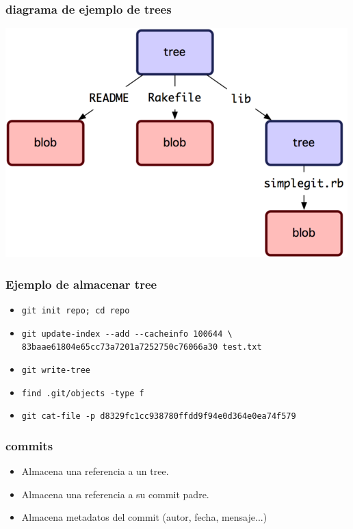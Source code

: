 \documentclass[10pt]{beamer}
\begin{document}
  \begin{frame}[containsverbatim]
    \frametitle{diagrama de ejemplo de trees}
    \begin{center}\includegraphics{trees.png}\end{center}
  \end{frame}

  \begin{frame}[containsverbatim]
    \frametitle{Ejemplo de almacenar tree}
    \begin{itemize}
        \item \verb$git init repo; cd repo$
        \item \verb$git update-index --add --cacheinfo 100644 \$ \verb$83baae61804e65cc73a7201a7252750c76066a30 test.txt$
        \item \verb$git write-tree$
        \item \verb$find .git/objects -type f$
        \item \verb$git cat-file -p d8329fc1cc938780ffdd9f94e0d364e0ea74f579$
    \end{itemize}
  \end{frame}

  \begin{frame}[containsverbatim]
    \frametitle{commits}
    \begin{itemize}
        \item Almacena una referencia a un tree.
        \item Almacena una referencia a su commit padre.
        \item Almacena metadatos del commit (autor, fecha, mensaje...)
    \end{itemize}
  \end{frame}
\end{document}
